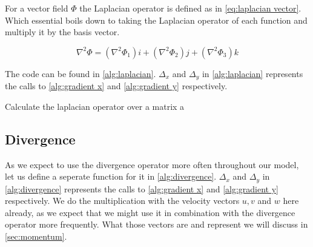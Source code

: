For a vector field $\Phi$ the Laplacian operator is defined as in \autoref{eq:laplacian vector}. Which essential boils down to taking the Laplacian operator of each function and multiply it by
the basis vector.

\begin{equation}
    \label{eq:laplacian vector}
    \nabla^2 \Phi = (\nabla^2 \Phi_1)i + (\nabla^2 \Phi_2)j + (\nabla^2 \Phi_3)k
\end{equation}

The code can be found in \autoref{alg:laplacian}. $\Delta_x$ and $\Delta_y$ in \autoref{alg:laplacian} represents the calls to \autoref{alg:gradient x} and \autoref{alg:gradient y} 
respectively.

\begin{algorithm}[hbt]
    \caption{Calculate the laplacian operator over a matrix a}
    \label{alg:laplacian}
    
     \;  
\end{algorithm}

\subsection{Divergence}
As we expect to use the divergence operator more often throughout our model, let us define a seperate function for it in \autoref{alg:divergence}. $\Delta_x$ and $\Delta_y$ in 
\autoref{alg:divergence} represents the calls to \autoref{alg:gradient x} and \autoref{alg:gradient y} respectively. We do the multiplication with the velocity vectors $u, v$ and $w$ here already, 
as we expect that we might use it in combination with the divergence operator more frequently. What those vectors are and represent we will discuss in \autoref{sec:momentum}.

